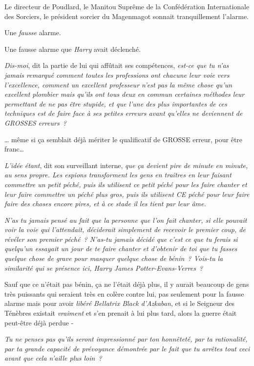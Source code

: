 Le directeur de Poudlard, le Manitou Suprême de la Confédération Internationale des Sorciers, le président sorcier du Magenmagot sonnait tranquillement l'alarme.

Une \emph{fausse} alarme.

Une fausse alarme que \emph{Harry} avait déclenché.

\emph{Dis-moi}, dit la partie de lui qui affûtait ses compétences, \emph{est-ce que tu n'as jamais remarqué comment toutes les professions ont chacune leur voie vers l'excellence, comment un excellent professeur n'est pas la même chose qu'un excellent plombier mais qu'ils ont tous deux en commun certaines méthodes leur permettant de ne pas être stupide, et que l'une des plus importantes de ces techniques est de faire face à ses petites erreurs avant qu'elles ne deviennent de GROSSES erreurs~?}

… même si ça semblait déjà mériter le qualificatif de GROSSE erreur, pour être franc…

\emph{L'idée étant}, dit son surveillant interne, \emph{que ça devient pire de minute en minute, au sens propre. Les espions transforment les gens en traîtres en leur faisant commettre un petit péché, puis ils utilisent ce petit péché pour les faire chanter et leur faire commettre un péché plus gros, puis ils utilisent CE péché pour leur faire faire des choses encore pires, et à ce stade il les tient par leur âme.}

\emph{N'as tu jamais pensé au fait que la personne que l'on fait chanter, si elle pouvait voir la voie qui l'attendait, déciderait simplement de recevoir le premier coup, de révéler son premier péché~? N'as-tu jamais décidé que c'est ce que tu ferais si quelqu'un essayait un jour de te faire chanter et d'obtenir de toi que tu fasses quelque chose de grave pour masquer quelque chose de bénin~? Vois-tu la similarité qui se présence ici, Harry James Potter-Evans-Verres~?}

Sauf que ce n'était pas bénin, ça ne l'était déjà plus, il y aurait beaucoup de gens très puissants qui seraient très en colère contre lui, pas seulement pour la fausse alarme mais pour avoir \emph{libéré Bellatrix Black d'Azkaban}, et si le Seigneur des Ténèbres existait \emph{vraiment} et s'en prenait à lui plus tard, alors la guerre était peut-être déjà perdue -

\emph{Tu ne penses pas qu'ils seront impressionné par ton honnêteté, par ta rationalité, par ta grande capacité de prévoyance démontrée par le fait que tu arrêtes tout ceci avant que cela n'aille plus loin~?}

